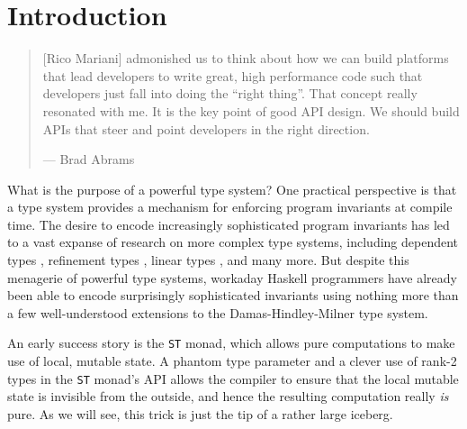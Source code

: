 \documentclass[format=sigplan, review=false, screen=true]{acmart}
\begin{document}
%
%



\maketitle

\renewcommand{\shortauthors}{M. Noonan}

%

\section{Introduction}
\begin{quote}
  [Rico Mariani] admonished us to think about how we can build platforms that lead developers to write great, high performance code such that developers just fall into doing the ``right thing''. That concept really resonated with me. It is the key point of good API design. We should build APIs that steer and point developers in the right direction.
  
  \hfill --- Brad Abrams \cite{pitofsuccess}
\end{quote}

What is the purpose of a powerful type system? One practical perspective is
that a type system provides a mechanism for enforcing program
invariants at compile time. The desire to encode increasingly
sophisticated program invariants has led to a vast expanse of research
on more complex type systems, including dependent types \cite{augustsson1998cayenne,bove2009dependent}, refinement types \cite{freeman1991refinement}, linear
types \cite{wadler1990linear}, and many more. But despite this menagerie of powerful
type systems, workaday Haskell programmers have already been able to encode
surprisingly sophisticated invariants using nothing more than a
few well-understood extensions to the Damas-Hindley-Milner type system.

An early success story is the \texttt{ST} monad, which allows pure
computations to make use of local, mutable state. A phantom type parameter
and a clever use of rank-2 types in the \texttt{ST} monad's API allows the
compiler to ensure that the local mutable state is invisible from the outside,
and hence the resulting computation really \emph{is} pure. As we will see, this
trick is just the tip of a rather large iceberg.
\end{document}
